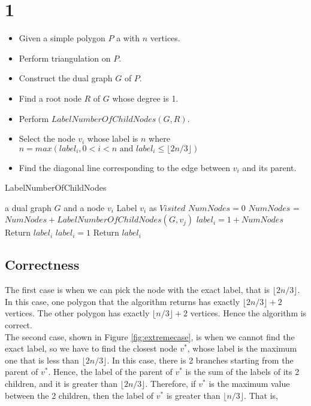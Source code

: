 
\section*{1}
\begin{itemize}
    \item Given a simple polygon $P$ a with $n$ vertices.
    \item Perform triangulation on $P$.
    \item Construct the dual graph $G$ of $P$.
    \item Find a root node $R$ of $G$ whose degree is 1.
    \item Perform $LabelNumberOfChildNodes(G,R)$.
    \item Select the node $v_i$ whose label is $n$ where $n = max(label_i,0<i<n \text{ and } label_i \leq \lfloor 2n/3\rfloor )$
    \item Find the diagonal line corresponding to the edge between $v_i$ and its parent.
\end{itemize}

\begin{algorithm}[h]
  \caption{LabelNumberOfChildNodes}
  \label{alg:LabelNumberOfChildNodes}
  \begin{algorithmic}
      \Require a dual graph $G$ and a node $v_i$
      \State Label $v_i$ as $Visited$
      \State $NumNodes = 0$
      \State $NumNodes$ = $NumNodes + LabelNumberOfChildNodes(G, v_j)$
      \EndIf
      \EndFor
      \State $label_i = 1 + NumNodes$
      \State Return $label_i$
      \Else
      \State $label_i = 1$
      \State Return $label_i$
      \EndIf
\end{algorithmic}
\end{algorithm}

\subsection*{Correctness}
The first case is when we can pick the node with the exact label, that is $\lfloor2n/3\rfloor$.
In this case, one polygon that the algorithm returns has exactly $\lfloor2n/3\rfloor + 2$ vertices. 
The other polygon has exactly $\lfloor n/3\rfloor + 2$ vertices.
Hence the algorithm is correct. \\

The second case, shown in Figure \ref{fig:extremecase}, is when we cannot find the exact label, so we have to find the closest node $v^*$, whose 
label is the maximum one that is less than $\lfloor2n/3\rfloor$. In this case, there is 2 branches starting
from the parent of $v^*$. Hence, the label of the parent of $v^*$ is the sum of the labels of its 2 children, 
and it is greater than $\lfloor2n/3\rfloor$. Therefore, if $v^*$ is the maximum value between the 2 children, 
then the label of $v^*$ is greater than $\lfloor n/3 \rfloor$. That is,

